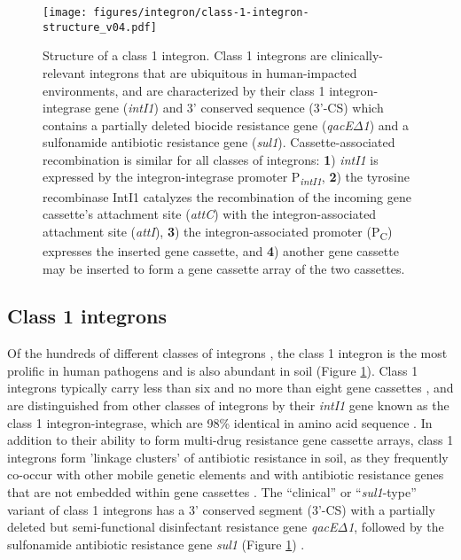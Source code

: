\begin{figure}[htpb]
	\centering
		\texttt{[image: figures/integron/class-1-integron-structure\_v04.pdf]}
	\caption[Structure of a class 1 integron.]{
		Structure of a class 1 integron.
		Class 1 integrons are clinically-relevant integrons that are ubiquitous in human-impacted environments, and are characterized by their class 1 integron-integrase gene (\textit{intI1}) and 3' conserved sequence (3'-CS) which contains a partially deleted biocide resistance gene (\textit{qacE$\Delta$1}) and a sulfonamide antibiotic resistance gene (\textit{sul1}).
		Cassette-associated recombination is similar for all classes of integrons:
		\textbf{1}) \textit{intI1} is expressed by the integron-integrase promoter P\textsubscript{\textit{intI1}},
		\textbf{2}) the tyrosine recombinase IntI1 catalyzes the recombination of the incoming gene cassette's attachment site (\textit{attC}) with the integron-associated attachment site (\textit{attI}),
		\textbf{3}) the integron-associated promoter (P\textsubscript{C}) expresses the inserted gene cassette, and
		\textbf{4}) another gene cassette may be inserted to form a gene cassette array of the two cassettes.
	}
	\label{fig:class-1-integron-structure}
\end{figure}

\subsection{Class 1 integrons}

Of the hundreds of different classes of integrons \parencite{Abella.2015}, the class 1 integron is the most prolific in human pathogens and is also abundant in soil \parencite{Dawes.2010, RuizMartinez.2011, Gillings.2018} (Figure \ref{fig:class-1-integron-structure}).
Class 1 integrons typically carry less than six and no more than eight gene cassettes \parencite{Gillings.2014, Naas.2001}, and are distinguished from other classes of integrons by their \textit{intI1} gene known as the class 1 integron-integrase, which are 98\% identical in amino acid sequence \parencite{Roy.2021}.
In addition to their ability to form multi-drug resistance gene cassette arrays, class 1 integrons form 'linkage clusters' of antibiotic resistance in soil, as they frequently co-occur with other mobile genetic elements and with antibiotic resistance genes that are not embedded within gene cassettes \parencite{Johnson.2016, Pal.2015}.
The “clinical” or “\textit{sul1}-type” variant of class 1 integrons has a 3’ conserved segment (3'-CS) with a partially deleted but semi-functional disinfectant resistance gene \textit{qacE${\Delta}$1}, followed by the sulfonamide antibiotic resistance gene \textit{sul1} (Figure \ref{fig:class-1-integron-structure}) \parencite{Partridge.2018}.

